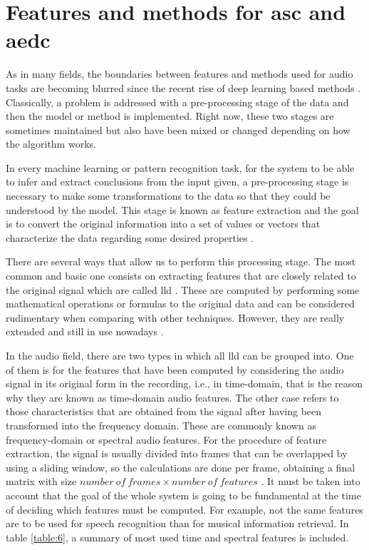 
\section{Features and methods for \acrshort{asc} and \acrshort{aedc}}
\label{section:features-and-methods-for-asc-aedc}
	
	As in many fields, the boundaries between features and methods used for audio tasks are becoming blurred since the recent rise of deep learning based methods . Classically, a problem is addressed with a pre-processing stage of the data and then the model or method is implemented. Right now, these two stages are sometimes maintained but also have been mixed or changed depending on how the algorithm works.


	In every machine learning or pattern recognition task, for the system to be able to infer and extract conclusions from the input given, a pre-processing stage is necessary to make some transformations to the data so that they could be understood by the model. This stage is known as feature extraction and the goal is to convert the original information into a set of values or vectors that characterize the data regarding some desired properties \cite{Giannakopoulos2014}.
	
	There are several ways that allow us to perform this processing stage. The most common and basic one consists on extracting features that are closely related to the original signal which are called \acrfull{lld}  \cite{Amatriain2004}. These are computed by performing some mathematical operations or formulas to the original data and can be considered rudimentary when comparing with other techniques. However, they are really extended and still in use nowadays \cite{Marr1982}. 

	In the audio field, there are two types in which all \acrshort{lld} can be grouped into. One of them is for the features that have been computed by considering the audio signal in its original form in the recording, i.e., in time-domain, that is the reason why they are known as time-domain audio features. The other case refers to those characteristics that are obtained from the signal after having been transformed into the frequency domain. These are commonly known as frequency-domain or spectral audio features. For the procedure of feature extraction, the signal is usually divided into frames that can be overlapped by using a sliding window, so the calculations are done per frame, obtaining a final matrix with size $number\ of\ frames \times number\ of\ features$ \cite{Giannakopoulos2014}. It must be taken into account that the goal of the whole system is going to be fundamental at the time of deciding which features must be computed. For example, not the same features are to be used for speech recognition than for musical information retrieval. In table \ref{table:6}, a summary of most used time and spectral features is included.
	
